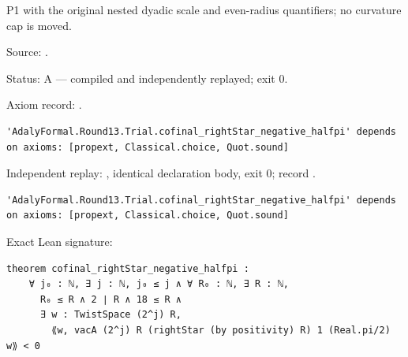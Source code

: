 \begin{theorem}[bp-431]
\label{bp-431}
\leanok
P1 with the original nested dyadic scale and even-radius quantifiers; no curvature cap is moved.

\par Source: \texttt{}.
\par Status: A — compiled and independently replayed; exit 0.
\par Axiom record: \texttt{}.
\begin{verbatim}
'AdalyFormal.Round13.Trial.cofinal_rightStar_negative_halfpi' depends on axioms: [propext, Classical.choice, Quot.sound]
\end{verbatim}
\par Independent replay: \texttt{}, identical declaration body, exit 0; record \texttt{}.
\begin{verbatim}
'AdalyFormal.Round13.Trial.cofinal_rightStar_negative_halfpi' depends on axioms: [propext, Classical.choice, Quot.sound]
\end{verbatim}
\par Exact Lean signature:
\begin{verbatim}
theorem cofinal_rightStar_negative_halfpi :
    ∀ j₀ : ℕ, ∃ j : ℕ, j₀ ≤ j ∧ ∀ R₀ : ℕ, ∃ R : ℕ,
      R₀ ≤ R ∧ 2 ∣ R ∧ 18 ≤ R ∧
      ∃ w : TwistSpace (2^j) R,
        ⟪w, vacA (2^j) R (rightStar (by positivity) R) 1 (Real.pi/2) w⟫ < 0
\end{verbatim}
\end{theorem}

